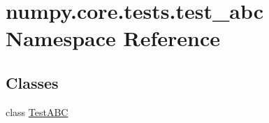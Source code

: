 \hypertarget{namespacenumpy_1_1core_1_1tests_1_1test__abc}{}\section{numpy.\+core.\+tests.\+test\+\_\+abc Namespace Reference}
\label{namespacenumpy_1_1core_1_1tests_1_1test__abc}
\subsection*{Classes}
\begin{DoxyCompactItemize}
\item 
class \hyperlink{classnumpy_1_1core_1_1tests_1_1test__abc_1_1TestABC}{Test\+A\+BC}
\end{DoxyCompactItemize}
